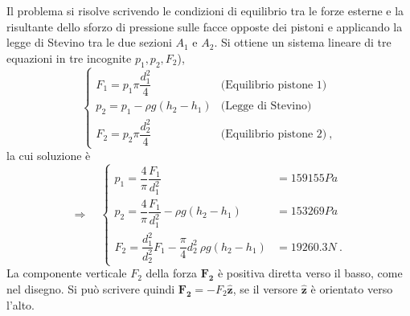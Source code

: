 \parttwo
 Il problema si risolve scrivendo le condizioni di equilibrio tra le forze esterne e la risultante dello sforzo di pressione sulle facce opposte dei pistoni e applicando la legge di Stevino tra le due sezioni $A_1$ e $A_2$.
Si ottiene un sistema lineare di tre equazioni in tre incognite $p_1, p_2, F_2$),
\begin{equation}
\begin{cases}
  F_1 = p_1 \pi \dfrac{d_1 ^2}{4} & \text{(Equilibrio pistone 1)} \\
  p_2 = p_1 - \rho g (h_2 - h_1) & \text{(Legge di Stevino)} \\
  F_2 = p_2 \pi \dfrac{d_2 ^2}{4} & \text{(Equilibrio pistone 2)} \ ,
\end{cases}
\end{equation}
la cui soluzione è
\begin{equation}
\Rightarrow \quad
\begin{cases}
  p_1 = \dfrac{4}{\pi} \dfrac{F_1}{d_1^2}  & = 159155 Pa \\
  p_2 = \dfrac{4}{\pi} \dfrac{F_1}{d_1^2} - \rho g (h_2 - h_1) & = 153269 Pa \\
  F_2 = \dfrac{d_1^2}{d_2^2} F_1 - \dfrac{\pi}{4}d_2^2 \ \rho g (h_2 - h_1) & = 19260.3  N \ .
\end{cases}
\end{equation}
La componente verticale $F_2$ della forza $\bm{F_2}$ è positiva diretta verso il basso, come nel disegno. Si  può scrivere quindi $\bm{F_2} = - F_2 \bm{\hat{z}}$, se il versore $\bm{\hat{z}}$ è orientato verso l'alto.
